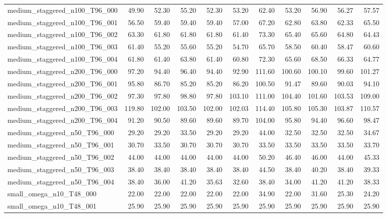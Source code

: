 \begin{table}[htbp]
\begin{tabular}{lrrrrrrrrrr}
medium\_staggered\_n100\_T96\_000 & 49.90 & 52.30 & 55.20 & 52.30 & 53.20 & 62.40 & 53.20 & 56.90 & 56.27 & 57.57 \\
medium\_staggered\_n100\_T96\_001 & 56.50 & 59.40 & 59.40 & 59.40 & 57.00 & 67.20 & 62.80 & 63.80 & 62.33 & 65.50 \\
medium\_staggered\_n100\_T96\_002 & 63.30 & 61.80 & 61.80 & 61.80 & 61.40 & 73.30 & 65.40 & 65.60 & 64.80 & 64.43 \\
medium\_staggered\_n100\_T96\_003 & 61.40 & 55.20 & 55.60 & 55.20 & 54.70 & 65.70 & 58.50 & 60.40 & 58.47 & 60.60 \\
medium\_staggered\_n100\_T96\_004 & 61.80 & 61.40 & 63.80 & 61.40 & 60.80 & 72.30 & 65.60 & 68.50 & 66.33 & 64.77 \\
medium\_staggered\_n200\_T96\_000 & 97.20 & 94.40 & 96.40 & 94.40 & 92.90 & 111.60 & 100.60 & 100.10 & 99.60 & 101.27 \\
medium\_staggered\_n200\_T96\_001 & 95.80 & 86.70 & 85.20 & 85.20 & 86.20 & 100.50 & 91.47 & 89.60 & 90.03 & 94.10 \\
medium\_staggered\_n200\_T96\_002 & 97.30 & 97.80 & 98.80 & 97.80 & 103.10 & 111.00 & 104.40 & 101.60 & 103.53 & 109.00 \\
medium\_staggered\_n200\_T96\_003 & 119.80 & 102.00 & 103.50 & 102.00 & 102.03 & 114.40 & 105.80 & 105.30 & 103.87 & 110.57 \\
medium\_staggered\_n200\_T96\_004 & 91.20 & 90.50 & 89.60 & 89.60 & 89.70 & 104.00 & 95.80 & 94.40 & 96.60 & 98.47 \\
medium\_staggered\_n50\_T96\_000 & 29.20 & 29.20 & 33.50 & 29.20 & 29.20 & 44.00 & 32.50 & 32.50 & 32.50 & 34.67 \\
medium\_staggered\_n50\_T96\_001 & 30.70 & 33.50 & 30.70 & 30.70 & 30.70 & 33.50 & 33.50 & 33.50 & 33.50 & 33.70 \\
medium\_staggered\_n50\_T96\_002 & 44.00 & 44.00 & 44.00 & 44.00 & 44.00 & 50.20 & 46.40 & 46.00 & 44.00 & 45.33 \\
medium\_staggered\_n50\_T96\_003 & 38.40 & 38.40 & 38.40 & 38.40 & 38.40 & 44.50 & 38.40 & 40.20 & 38.40 & 39.33 \\
medium\_staggered\_n50\_T96\_004 & 38.40 & 36.00 & 41.20 & 35.63 & 32.60 & 38.40 & 34.00 & 41.20 & 41.20 & 38.33 \\
small\_omega\_n10\_T48\_000 & 22.00 & 22.00 & 22.00 & 22.00 & 22.00 & 34.90 & 22.00 & 31.60 & 25.30 & 24.20 \\
small\_omega\_n10\_T48\_001 & 25.90 & 25.90 & 25.90 & 25.90 & 25.90 & 25.90 & 25.90 & 25.90 & 25.90 & 25.90 \\

\end{tabular}
\end{table}

